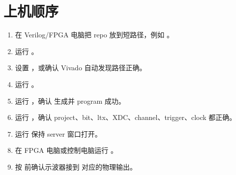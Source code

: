 \documentclass[11pt,oneside,openany]{book}
\begin{document}
\chapter{上机顺序}
\begin{enumerate}
  \item 在 Verilog/FPGA 电脑把 repo 放到短路径，例如 。
  \item 运行 。
  \item 设置 ，或确认 Vivado 自动发现路径正确。
  \item 运行 。
  \item 运行 ，确认  生成并 program 成功。
  \item 运行 ，确认 project、bit、ltx、XDC、channel、trigger、clock 都正确。
  \item 运行  保持 server 窗口打开。
  \item 在 FPGA 电脑或控制电脑运行 。
  \item 按  前确认示波器接到  对应的物理输出。
\end{enumerate}
\end{document}
